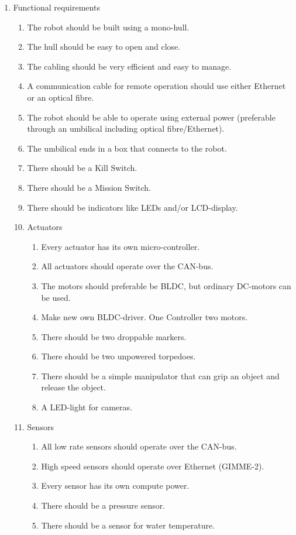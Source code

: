 \begin{enumerate}
\label{requirements}
\item Functional requirements
\begin{enumerate}
\item The robot should be built using a mono-hull.
\item The hull should be easy to open and close.
\item The cabling should be very efficient and easy to manage.
\item A communication cable for remote operation should use either Ethernet or an optical fibre. 
\item The robot should be able to operate using external power (preferable through an umbilical including optical fibre/Ethernet).
\item The umbilical ends in a box that connects to the robot. 
\item There should be a Kill Switch.
\item There should be a Mission Switch.
\item There should be indicators like LEDs and/or LCD-display.
\item Actuators
\begin{enumerate}
\item Every actuator has its own micro-controller.
\item All actuators should operate over the CAN-bus.
\item The motors should preferable be BLDC, but ordinary DC-motors can be used.
\item Make new own BLDC-driver. One Controller two motors.
\item There should be two droppable markers.
\item There should be two unpowered torpedoes.
\item There should be a simple manipulator that can grip an object and release the object.
\item A LED-light for cameras.
\end{enumerate}
\item Sensors
\begin{enumerate}
\item All low rate sensors should operate over the CAN-bus.
\item High speed sensors should operate over Ethernet (GIMME-2).
\item Every sensor has its own compute power.
\item There should be a pressure sensor. 
\item There should be a sensor for water temperature.

\end{enumerate}
\end{enumerate}
\end{enumerate}
